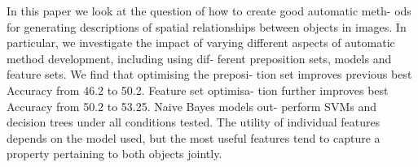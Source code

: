 In this paper we look at the question of how to create good automatic meth- ods for generating descriptions of spatial relationships between objects in images. In particular, we investigate the impact of varying different aspects of automatic method development, including using dif- ferent preposition sets, models and feature sets. We find that optimising the preposi- tion set improves previous best Accuracy from 46.2 to 50.2. Feature set optimisa- tion further improves best Accuracy from 50.2 to 53.25. Naive Bayes models out- perform SVMs and decision trees under all conditions tested. The utility of individual features depends on the model used, but the most useful features tend to capture a property pertaining to both objects jointly.

